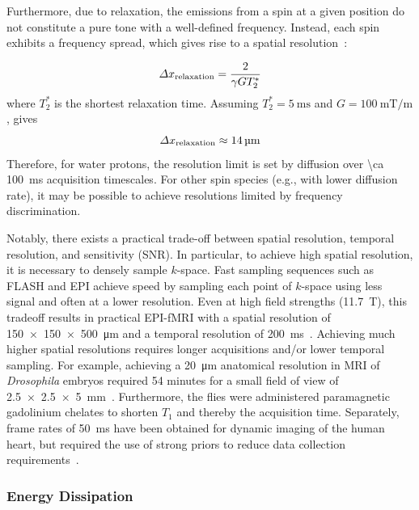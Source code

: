 Furthermore, due to relaxation, the emissions from a spin at a given position do not constitute a pure tone with a well-defined frequency. Instead, each spin exhibits a frequency spread, which gives rise to a spatial resolution~\cite{glover02}:

\[\Delta x_{\text{\scriptsize relaxation}} = \frac{2}{\gamma G T_2^*}\]
where $T_2^*$ is the shortest relaxation time. Assuming $T_2^*=\SI{5}{\milli\second}$ and $G=\SI{100}{\milli\tesla\per\meter}$, gives
\[\Delta x_{\text{\scriptsize relaxation}}\approx \SI{14}{\micro\meter}\]
Therefore, for water protons, the resolution limit is set by diffusion over \SI{\ca 100}{\milli\second} acquisition timescales. For other spin species (e.g., with lower diffusion rate), it may be possible to achieve resolutions limited by frequency discrimination.

Notably, there exists a practical trade-off between spatial resolution, temporal resolution, and sensitivity (SNR). In particular, to achieve high spatial resolution, it is necessary to densely sample $k$-space.
Fast sampling sequences such as FLASH and EPI achieve speed by sampling each point of $k$-space using less signal and often at a lower resolution.
Even at high field strengths (\SI{11.7}{\tesla}), this tradeoff results in practical EPI-fMRI with a spatial resolution of \SI{150 x 150 x 500}{\micro\meter} and a temporal resolution of \SI{200}{\milli\second}~\cite{yu12}.
Achieving much higher spatial resolutions requires longer acquisitions and/or lower temporal sampling.
For example, achieving a \SI{20}{\micro\meter} anatomical resolution in MRI of \emph{Drosophila} embryos required 54 minutes for a small field of view of \SI{2.5 x 2.5 x 5}{\milli\meter}~\cite{null08}.
Furthermore, the flies were administered paramagnetic gadolinium chelates to shorten $T_1$ and thereby the acquisition time.
Separately, frame rates of \SI{50}{\milli\second} have been obtained for dynamic imaging of the human heart, but required the use of strong priors to reduce data collection requirements~\cite{zhang10}.

\subsubsection{Energy Dissipation}


